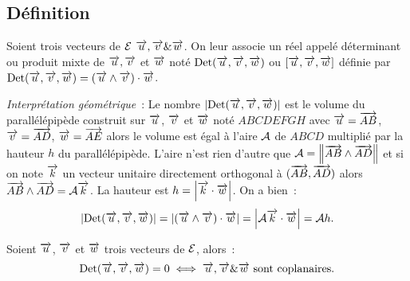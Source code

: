 \subsection{Définition}
\begin{defdef}
  Soient trois vecteurs de $\E$ $\vu,\vv \& \vw$. On leur associe un réel appelé déterminant ou produit mixte de $\vu,\vv$ et $\vw$ noté $\Det(\vu,\vv,\vw)$ ou $[\vu,\vv,\vw]$ définie par $\Det(\vu,\vv,\vw)=(\vu\wedge\vv)\cdot\vw$.
\end{defdef}

\emph{Interprétation géométrique}~: Le nombre $\abs{\Det(\vu,\vv,\vw)}$ est le volume du parallélépipède construit sur $\vu$, $\vv$ et $\vw$ noté $ABCDEFGH$ avec $\vu=\vect{AB}$, $\vv=\vect{AD}$, $\vw=\vect{AE}$ alors le volume est égal à l'aire $\A$ de $ABCD$ multiplié par la hauteur $h$ du parallélépipède. L'aire n'est rien d'autre que $\A=\norme{\vect{AB}\wedge\vect{AD}}$ et si on note $\vk$ un vecteur unitaire directement orthogonal à $(\vect{AB},\vect{AD})$ alors $\vect{AB}\wedge\vect{AD}=\A \vk$. La hauteur est $h=\abs{\vk\cdot\vw}$. On a bien~:
\begin{equation}
  \abs{\Det(\vu,\vv,\vw)}=\abs{(\vu\wedge\vv)\cdot\vw}=\abs{\A\vk\cdot\vw}=\A h.
\end{equation}
\begin{prop}
  Soient $\vu$, $\vv$ et $\vw$ trois vecteurs de $\E$, alors~:
  \begin{equation}
    \Det(\vu,\vv,\vw)=0 \iff \vu,\vv\&\vw \text{~sont coplanaires}.
  \end{equation}
\end{prop}
